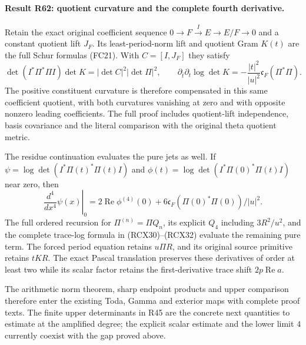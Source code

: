 \paragraph{Result R62: quotient curvature and the complete fourth derivative.}
Retain the exact original coefficient sequence
$0\to F\xrightarrow I E\to E/F\to0$ and a constant quotient lift
$J_F$. Its least-period-norm lift and quotient Gram $K(t)$ are the
full Schur formulas (FC21). With $C=[I,J_F]$ they satisfy
\[
 \det(I^*\Pi^*\Pi I)\det K
      =|\det C|^2|\det\Pi|^2,
 \qquad
 \partial_{\bar t}\partial_t\log\det K
      =-\frac{|t|^2}{|u|^2}\mathfrak c_F(\Pi^*\Pi).
\]
The positive constituent curvature is therefore compensated in this
same coefficient quotient, with both curvatures vanishing at zero
and with opposite nonzero leading coefficients. The full proof
includes quotient-lift independence, basis covariance and the
literal comparison with the original theta quotient metric.

The residue continuation evaluates the pure jets as well. If
$\psi=\log\det(I^*\Pi(t)^*\Pi(t)I)$ and
$\phi(t)=\log\det(I^*\Pi(0)^*\Pi(t)I)$ near zero, then
\[
 \left.\frac{d^4}{dx^4}\psi(x)\right|_0
   =2\operatorname{Re}\phi^{(4)}(0)
       +6\mathfrak c_F(\Pi(0)^*\Pi(0))/|u|^2.
\]
The full ordered recursion for $\Pi^{(n)}=\Pi Q_n$, its explicit
$Q_4$ including $3R^2/u^2$, and the complete trace-log formula in
(RCX30)--(RCX32) evaluate the remaining pure term. The forced
period equation retains $u\Pi R$, and its original source
primitive retains $tKR$. The exact Pascal translation preserves
these derivatives of order at least two while its scalar factor
retains the first-derivative trace shift $2p\operatorname{Re}a$.


The arithmetic norm theorem, sharp endpoint products and upper
comparison therefore enter the existing Toda, Gamma and exterior
maps with complete proof texts. The finite upper determinants in
R45 are the concrete next quantities to estimate at the amplified
degree; the explicit scalar estimate and the lower limit $4$
currently coexist with the gap proved above.
